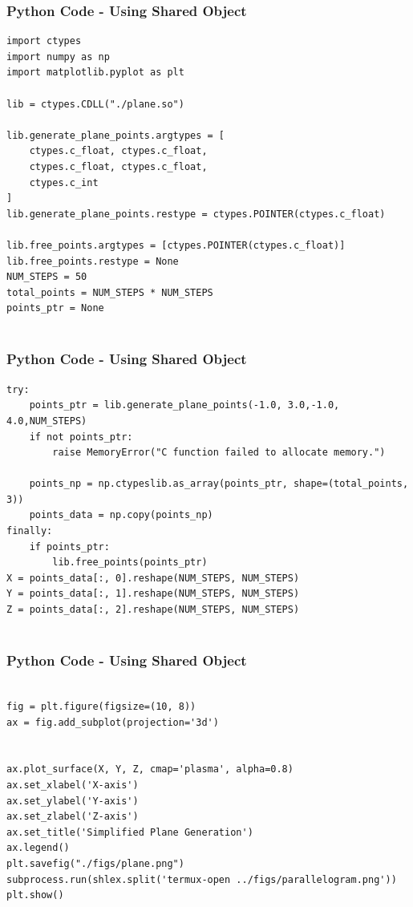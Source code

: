 \documentclass{beamer}
\begin{document}
\begin{frame}[fragile]
    \frametitle{Python Code - Using Shared Object}
    \begin{lstlisting}
import ctypes
import numpy as np
import matplotlib.pyplot as plt

lib = ctypes.CDLL("./plane.so")

lib.generate_plane_points.argtypes = [
    ctypes.c_float, ctypes.c_float,
    ctypes.c_float, ctypes.c_float,
    ctypes.c_int
]
lib.generate_plane_points.restype = ctypes.POINTER(ctypes.c_float)

lib.free_points.argtypes = [ctypes.POINTER(ctypes.c_float)]
lib.free_points.restype = None
NUM_STEPS = 50  
total_points = NUM_STEPS * NUM_STEPS
points_ptr = None


\end{lstlisting}
\end{frame}

\begin{frame}[fragile]
    \frametitle{Python Code - Using Shared Object}
    \begin{lstlisting}
try: 
    points_ptr = lib.generate_plane_points(-1.0, 3.0,-1.0, 4.0,NUM_STEPS)
    if not points_ptr:
        raise MemoryError("C function failed to allocate memory.")
   
    points_np = np.ctypeslib.as_array(points_ptr, shape=(total_points, 3))
    points_data = np.copy(points_np)
finally:
    if points_ptr:
        lib.free_points(points_ptr)
X = points_data[:, 0].reshape(NUM_STEPS, NUM_STEPS)
Y = points_data[:, 1].reshape(NUM_STEPS, NUM_STEPS)
Z = points_data[:, 2].reshape(NUM_STEPS, NUM_STEPS)


\end{lstlisting}
\end{frame}
\begin{frame}[fragile]
    \frametitle{Python Code - Using Shared Object}
    \begin{lstlisting}

fig = plt.figure(figsize=(10, 8))
ax = fig.add_subplot(projection='3d')


ax.plot_surface(X, Y, Z, cmap='plasma', alpha=0.8)
ax.set_xlabel('X-axis')
ax.set_ylabel('Y-axis')
ax.set_zlabel('Z-axis')
ax.set_title('Simplified Plane Generation')
ax.legend()
plt.savefig("./figs/plane.png")
subprocess.run(shlex.split('termux-open ../figs/parallelogram.png'))
plt.show()

\end{lstlisting}
\end{frame}
\end{document}
